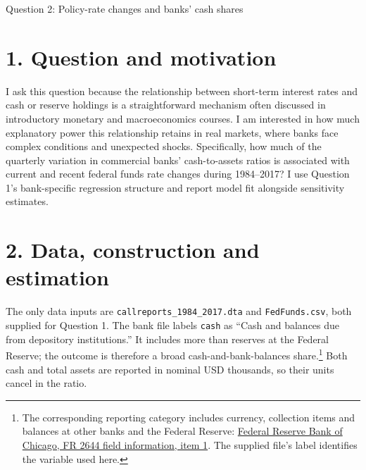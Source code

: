 \documentclass[10pt]{article}
\begin{document}
\begin{center}\Large Question 2: Policy-rate changes and banks' cash shares\end{center}

\section*{1. Question and motivation}
I ask this question because the relationship between short-term interest rates and cash or reserve holdings is a straightforward mechanism often discussed in introductory monetary and macroeconomics courses. I am interested in how much explanatory power this relationship retains in real markets, where banks face complex conditions and unexpected shocks. Specifically, how much of the quarterly variation in commercial banks' cash-to-assets ratios is associated with current and recent federal funds rate changes during 1984--2017? I use Question 1's bank-specific regression structure and report model fit alongside sensitivity estimates.

\section*{2. Data, construction and estimation}
The only data inputs are \texttt{callreports\_1984\_2017.dta} and \texttt{FedFunds.csv}, both supplied for Question 1. The bank file labels \texttt{cash} as ``Cash and balances due from depository institutions.'' It includes more than reserves at the Federal Reserve; the outcome is therefore a broad cash-and-bank-balances share.\footnote{The corresponding reporting category includes currency, collection items and balances at other banks and the Federal Reserve: \href{https://www.chicagofed.org/banking/financial-institution-reports/fr2644-field-information}{Federal Reserve Bank of Chicago, FR 2644 field information, item 1}. The supplied file's label identifies the variable used here.} Both cash and total assets are reported in nominal USD thousands, so their units cancel in the ratio.
\end{document}
